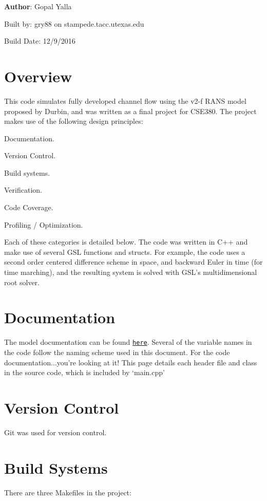 {\bfseries Author}: Gopal Yalla

Built by: gry88 on stampede.tacc.utexas.edu

Build Date: 12/9/2016 

\hypertarget{index_Overview}{}\section{Overview}\label{index_Overview}
This code simulates fully developed channel flow using the v2-\/f RANS model proposed by Durbin, and was written as a final project for CSE380. The project makes use of the following design principles:


\begin{DoxyItemize}
\item Documentation. 
\item Version Control. 
\item Build systems. 
\item Verification. 
\item Code Coverage. 
\item Profiling / Optimization. 
\end{DoxyItemize}

Each of these categories is detailed below. The code was written in C++ and make use of several GSL functions and structs. For example, the code uses a second order centered difference scheme in space, and backward Euler in time (for time marching), and the resulting system is solved with GSL's multidimensional root solver.\hypertarget{index_doc}{}\section{Documentation}\label{index_doc}
The model documentation can be found \href{http://users.ices.utexas.edu/~gopal/v2f/Problem_Statement.pdf}{\tt here}. Several of the variable names in the code follow the naming scheme used in this document. For the code documentation...you're looking at it! This page details each header file and class in the source code, which is included by `main.cpp'\hypertarget{index_vc}{}\section{Version Control}\label{index_vc}
Git was used for version control.\hypertarget{index_make}{}\section{Build Systems}\label{index_make}
There are three Makefiles in the project:


